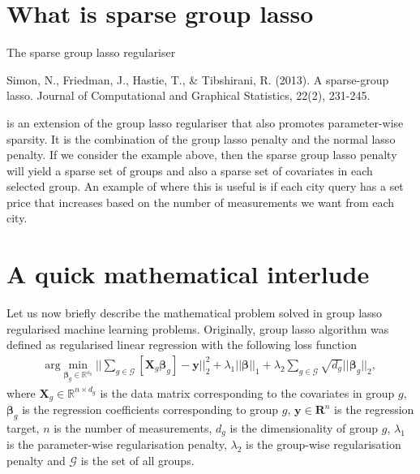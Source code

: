 \documentclass[letterpaper,10pt,english]{sphinxmanual}
\begin{document}
\chapter{What is sparse group lasso}
\label{\detokenize{index:what-is-sparse-group-lasso}}
The sparse group lasso regulariser %
\begin{footnote}[2]\sphinxAtStartFootnote
Simon, N., Friedman, J., Hastie, T., \& Tibshirani, R. (2013).
A sparse-group lasso. Journal of Computational and Graphical
Statistics, 22(2), 231-245.
%
\end{footnote} is an extension of the group lasso
regulariser that also promotes parameter-wise sparsity. It is the combination
of the group lasso penalty and the normal lasso penalty. If we consider the
example above, then the sparse group lasso penalty will yield a sparse set
of groups and also a sparse set of covariates in each selected group. An
example of where this is useful is if each city query has a set price that
increases based on the number of measurements we want from each city.


\chapter{A quick mathematical interlude}
\label{\detokenize{index:a-quick-mathematical-interlude}}
Let us now briefly describe the mathematical problem solved in group lasso
regularised machine learning problems. Originally, group lasso algorithm \sphinxfootnotemark[1]
was defined as regularised linear regression with the following loss function
\begin{equation*}
\begin{split}\text{arg} \min_{\mathbf{\beta}_g \in \mathbb{R^{d_g}}}
|| \sum_{g \in \mathcal{G}} \left[\mathbf{X}_g\mathbf{\beta}_g\right] - \mathbf{y} ||_2^2
+ \lambda_1 ||\mathbf{\beta}||_1
+ \lambda_2 \sum_{g \in \mathcal{G}} \sqrt{d_g}||\mathbf{\beta}_g||_2,\end{split}
\end{equation*}
where \(\mathbf{X}_g \in \mathbb{R}^{n \times d_g}\) is the data matrix
corresponding to the covariates in group \(g\), \(\mathbf{\beta}_g\)
is the regression coefficients corresponding to group \(g\),
\(\mathbf{y} \in \mathbf{R}^n\) is the regression target, \(n\) is the
number of measurements, \(d_g\) is the dimensionality of group \(g\),
\(\lambda_1\) is the parameter-wise regularisation penalty,
\(\lambda_2\) is the group-wise regularisation penalty and
\(\mathcal{G}\) is the set of all groups.
\end{document}
